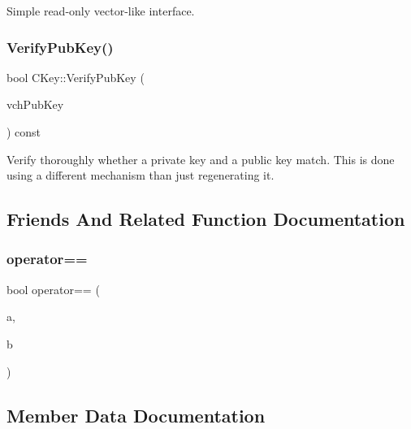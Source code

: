 Simple read-\/only vector-\/like interface. 

\mbox{\label{class_c_key_ac53425b8d0f89067bce781c485101b20}} 
\subsubsection{\texorpdfstring{Verify\+Pub\+Key()}{VerifyPubKey()}}
{\footnotesize\ttfamily bool C\+Key\+::\+Verify\+Pub\+Key (\begin{DoxyParamCaption}\item[{const \mbox{\hyperlink{class_c_pub_key}{C\+Pub\+Key}} \&}]{vch\+Pub\+Key }\end{DoxyParamCaption}) const}

Verify thoroughly whether a private key and a public key match. This is done using a different mechanism than just regenerating it. 

\subsection{Friends And Related Function Documentation}
\mbox{\label{class_c_key_a381efd9184dc467e73e690329c70371d}} 
\subsubsection{\texorpdfstring{operator==}{operator==}}
{\footnotesize\ttfamily bool operator== (\begin{DoxyParamCaption}\item[{const \mbox{\hyperlink{class_c_key}{C\+Key}} \&}]{a,  }\item[{const \mbox{\hyperlink{class_c_key}{C\+Key}} \&}]{b }\end{DoxyParamCaption})\hspace{0.3cm}{\ttfamily [friend]}}



\subsection{Member Data Documentation}
\mbox{\label{class_c_key_a9e5f8cac8811466c735d7af6f17a0dfe}} 
